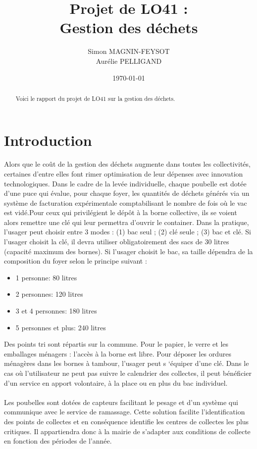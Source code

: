 \documentclass[12pt]{article}
\title{\textbf{Projet de LO41 : \\Gestion des déchets}}
\author{Simon MAGNIN-FEYSOT\\
		Aurélie PELLIGAND}
\date{\today}
\begin{document}
\maketitle
\begin{abstract}
Voici le rapport du projet de LO41 sur la gestion des déchets.
\end{abstract}


\section{Introduction}
\paragraph{}Alors que le coût de la gestion des déchets augmente dans toutes les collectivités, certaines d'entre elles font rimer optimisation de leur dépenses avec innovation technologiques. Dans le cadre de la levée individuelle, chaque poubelle est dotée d'une puce qui évalue, pour chaque foyer, les quantités de déchets générés via un système de facturation expérimentale comptabilisant le nombre de fois où le vac est vidé.Pour ceux qui privilégient le dépôt à la borne collective, ils se voient alors remettre une clé qui leur permettra d'ouvrir le container. Dans la pratique, l’usager peut choisir entre 3 modes : (1) bac seul ; (2) clé seule ; (3) bac et clé. Si l’usager choisit la clé, il devra utiliser obligatoirement des sacs de 30 litres (capacité maximum des bornes). Si l’usager choisit le bac, sa taille dépendra de la composition du foyer selon le principe suivant :
\begin{itemize}
\item 1 personne: 80 litres
\item 2 personnes: 120 litres
\item 3 et 4 personnes: 180 litres
\item 5 personnes et plus: 240 litres
\end{itemize}
Des points tri sont répartis sur la commune. Pour le papier, le verre et les emballages ménagers : l’accès à la borne est libre. Pour déposer les ordures ménagères dans les bornes à tambour, l’usager peut s ‘équiper d’une clé. Dans le cas où l’utilisateur ne peut pas suivre le calendrier des collectes, il peut bénéficier d’un service en apport volontaire, à la place ou en plus du bac individuel.

\paragraph{}Les poubelles sont dotées de capteurs facilitant le pesage et d’un système qui communique avec le service de ramassage. Cette solution facilite l’identification des points de collectes et en conséquence identifie les centres de collectes les plus critiques. Il appartiendra donc à la mairie de s’adapter aux conditions de collecte en fonction des périodes de l’année.
\end{document}
